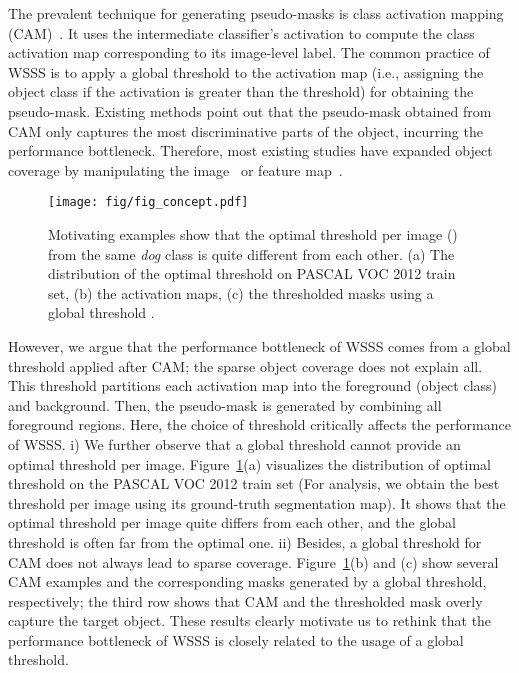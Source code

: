 \documentclass[10pt,twocolumn,letterpaper]{article}
\begin{document}
The prevalent technique for generating pseudo-masks is class activation mapping (CAM)~\cite{zhou2016learning}. It uses the intermediate classifier's activation to compute the class activation map corresponding to its image-level label. The common practice of WSSS is to apply a global threshold to the activation map (i.e., assigning the object class if the activation is greater than the threshold) for obtaining the pseudo-mask. Existing methods point out that the pseudo-mask obtained from CAM only captures the most discriminative parts of the object, incurring the performance bottleneck. Therefore, most existing studies have expanded object coverage by manipulating the image~\cite{li2018tell,wei2017object} or feature map~\cite{lee2019ficklenet,jiang2019integral}.

\begin{figure}[t]
\centering
\texttt{[image: fig/fig\_concept.pdf]}
\vspace{-1mm}
\caption{Motivating examples show that the optimal threshold per image () from the same \emph{dog} class is quite different from each other. (a) The distribution of the optimal threshold on PASCAL VOC 2012 train set, (b) the activation maps, (c) the thresholded masks using a global threshold .}
\label{fig:concept}
\vspace{-5mm}
\end{figure} 
However, we argue that the performance bottleneck of WSSS comes from a global threshold applied after CAM; the sparse object coverage does not explain all. This threshold partitions each activation map into the foreground (object class) and background. Then, the pseudo-mask is generated by combining all foreground regions. Here, the choice of threshold critically affects the performance of WSSS. i) We further observe that a global threshold cannot provide an optimal threshold per image. Figure~\ref{fig:concept}(a) visualizes the distribution of optimal threshold on the PASCAL VOC 2012 train set (For analysis, we obtain the best threshold per image using its ground-truth segmentation map). It shows that the optimal threshold per image quite differs from each other, and the global threshold is often far from the optimal one. ii) Besides, a global threshold for CAM does not always lead to sparse coverage. Figure~\ref{fig:concept}(b) and (c) show several CAM examples and the corresponding masks generated by a global threshold, respectively; the third row shows that CAM and the thresholded mask overly capture the target object. These results clearly motivate us to rethink that the performance bottleneck of WSSS is closely related to the usage of a global threshold.
\end{document}
